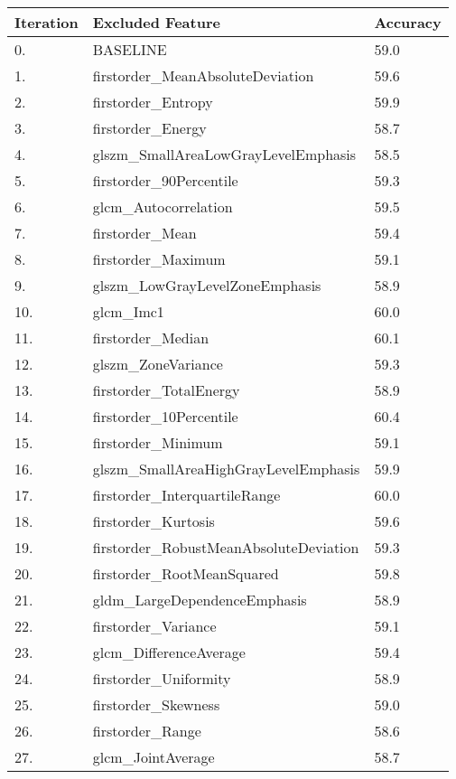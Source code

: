 \begin{longtable}[H]{|l|l|l|}
\hline
\textbf{Iteration} & \textbf{Excluded Feature} & \textbf{Accuracy} \\ \hline
0. & BASELINE & 59.0 \\ \hline
1. & firstorder\_MeanAbsoluteDeviation & 59.6 \\ \hline
2. & firstorder\_Entropy & 59.9 \\ \hline
3. & firstorder\_Energy & 58.7 \\ \hline
4. & glszm\_SmallAreaLowGrayLevelEmphasis & 58.5 \\ \hline
5. & firstorder\_90Percentile & 59.3 \\ \hline
6. & glcm\_Autocorrelation & 59.5 \\ \hline
7. & firstorder\_Mean & 59.4 \\ \hline
8. & firstorder\_Maximum & 59.1 \\ \hline
9. & glszm\_LowGrayLevelZoneEmphasis & 58.9 \\ \hline
10. & glcm\_Imc1 & 60.0 \\ \hline
11. & firstorder\_Median & 60.1 \\ \hline
12. & glszm\_ZoneVariance & 59.3 \\ \hline
13. & firstorder\_TotalEnergy & 58.9 \\ \hline
14. & firstorder\_10Percentile & 60.4 \\ \hline
15. & firstorder\_Minimum & 59.1 \\ \hline
16. & glszm\_SmallAreaHighGrayLevelEmphasis & 59.9 \\ \hline
17. & firstorder\_InterquartileRange & 60.0 \\ \hline
18. & firstorder\_Kurtosis & 59.6 \\ \hline
19. & firstorder\_RobustMeanAbsoluteDeviation & 59.3 \\ \hline
20. & firstorder\_RootMeanSquared & 59.8 \\ \hline
21. & gldm\_LargeDependenceEmphasis & 58.9 \\ \hline
22. & firstorder\_Variance & 59.1 \\ \hline
23. & glcm\_DifferenceAverage & 59.4 \\ \hline
24. & firstorder\_Uniformity & 58.9 \\ \hline
25. & firstorder\_Skewness & 59.0 \\ \hline
26. & firstorder\_Range & 58.6 \\ \hline
27. & glcm\_JointAverage & 58.7 \\ \hline

\end{longtable}
